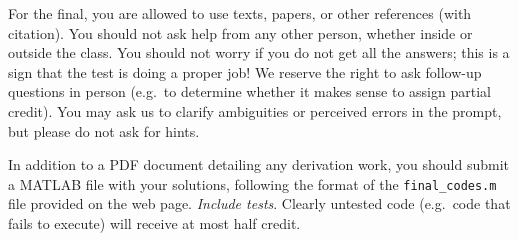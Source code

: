 \documentclass[12pt, leqno]{article}
\begin{document}

For the final, you are allowed to use texts, papers, or other
references (with citation).  You should not ask help from any other
person, whether inside or outside the class.  You should not worry if
you do not get all the answers; this is a sign that the test is doing
a proper job!  We reserve the right to ask follow-up questions in
person (e.g.~to determine whether it makes sense to assign partial
credit).  You may ask us to clarify ambiguities or perceived errors in
the prompt, but please do not ask for hints.

In addition to a PDF document detailing any derivation work,
you should submit a MATLAB file with your solutions, following
the format of the \verb|final_codes.m| file provided on the web page.
{\em Include tests}.  Clearly untested code (e.g.~code that fails to
execute) will receive at most half credit.
\end{document}
